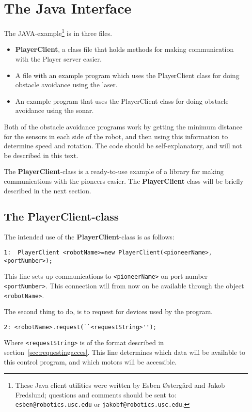 \documentclass[11pt]{article}
\begin{document}
\newpage
\section{The Java Interface}
The JAVA-example\footnote{These Java client utilities were written
by Esben \O{}sterg\aa{}rd and Jakob Fredslund; questions and comments should be sent to:
{\tt esben@robotics.usc.edu} or {\tt jakobf@robotics.usc.edu}.} is in three 
files. 
\begin{itemize}
\item {\bf PlayerClient}, a class file that holds methods for making communication with the Player server easier. 
\item A file with an example program which uses the PlayerClient class for doing obstacle avoidance using the laser.
\item An example program that uses the PlayerClient class for doing obstacle avoidance using the sonar.
\end{itemize}

Both of the obstacle avoidance programs work by getting the minimum distance for the sensors in each side of the robot, and then using this information to determine speed and rotation. The code should be self-explanatory, and will not be described in this text. 

The {\bf PlayerClient}-class is a ready-to-use example of a library for making communications with the pioneers easier. The {\bf PlayerClient}-class will be briefly described in the next section.

\subsection{The {\bf PlayerClient}-class}
The intended use of the {\bf PlayerClient}-class is as follows:
\begin{verbatim}
1:  PlayerClient <robotName>=new PlayerClient(<pioneerName>,<portNumber>);
\end{verbatim}  
This line sets up communications to \texttt{<pioneerName>} on port number \texttt{<portNumber>}. This connection will from now on be available through the object \texttt{<robotName>}.

The second thing to do, is to request for devices used by the program.
\begin{verbatim}
2: <robotName>.request(``<requestString>'');
\end{verbatim}
Where \texttt{<requestString>} is of the format described in section~\ref{sec:requestingacces}. This line determines which data will be available to this control program, and which motors will be accessible.
\end{document}
